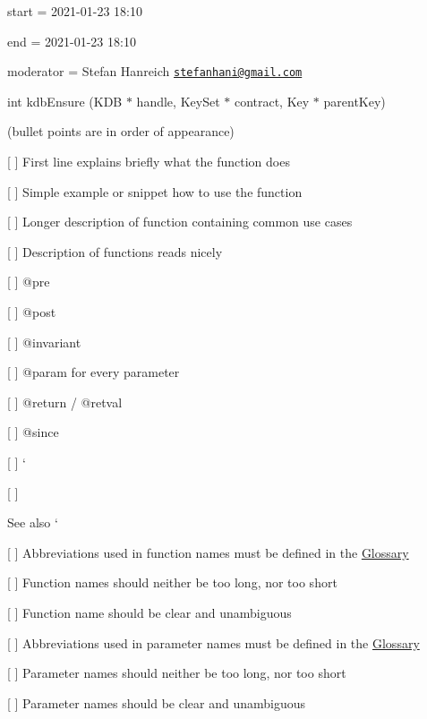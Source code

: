 
\begin{DoxyItemize}
\item start = 2021-\/01-\/23 18\+:10
\item end = 2021-\/01-\/23 18\+:10
\item moderator = Stefan Hanreich \href{mailto:stefanhani@gmail.com}{\tt stefanhani@gmail.\+com}
\end{DoxyItemize}

{\ttfamily int kdb\+Ensure (K\+DB $\ast$ handle, Key\+Set $\ast$ contract, Key $\ast$ parent\+Key)}

(bullet points are in order of appearance)


\begin{DoxyItemize}
\item \mbox{[} \mbox{]} First line explains briefly what the function does
\item \mbox{[} \mbox{]} Simple example or snippet how to use the function
\item \mbox{[} \mbox{]} Longer description of function containing common use cases
\item \mbox{[} \mbox{]} Description of functions reads nicely
\item \mbox{[} \mbox{]} {\ttfamily @pre}
\item \mbox{[} \mbox{]} {\ttfamily @post}
\item \mbox{[} \mbox{]} {\ttfamily @invariant}
\item \mbox{[} \mbox{]} {\ttfamily @param} for every parameter
\item \mbox{[} \mbox{]} {\ttfamily @return} / {\ttfamily @retval}
\item \mbox{[} \mbox{]} {\ttfamily @since}
\item \mbox{[} \mbox{]} `{\ttfamily }
\item {\ttfamily \mbox{[} \mbox{]}}\begin{DoxySeeAlso}{See also}
`
\end{DoxySeeAlso}

\end{DoxyItemize}


\begin{DoxyItemize}
\item \mbox{[} \mbox{]} Abbreviations used in function names must be defined in the \hyperlink{doc_help_elektra-glossary_md}{Glossary}
\item \mbox{[} \mbox{]} Function names should neither be too long, nor too short
\item \mbox{[} \mbox{]} Function name should be clear and unambiguous
\item \mbox{[} \mbox{]} Abbreviations used in parameter names must be defined in the \hyperlink{doc_help_elektra-glossary_md}{Glossary}
\item \mbox{[} \mbox{]} Parameter names should neither be too long, nor too short
\item \mbox{[} \mbox{]} Parameter names should be clear and unambiguous
\end{DoxyItemize}

